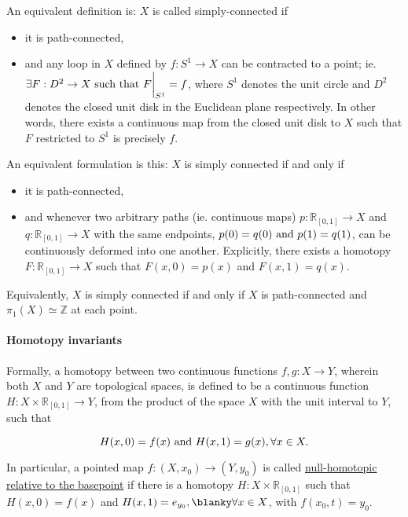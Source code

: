 An equivalent definition is: $X$ is called simply-connected if

\begin{itemize}
    \item it is path-connected, 
    \item and any loop in $X$ defined by $f: S^{1} \to X$ can be contracted to a point; ie. $\exists F: D^{2} \to X \textnormal{ such that } F\bigg|_{S^{1}} = f$, where ${S^{1}}$ denotes the unit circle and $D^2$ denotes the closed unit disk in the Euclidean plane respectively. In other words, there exists a continuous map from the closed unit disk to $X$ such that $F$ restricted to $S^1$ is precisely $f$.
\end{itemize}

An equivalent formulation is this: $X$ is simply connected if and only if 

\begin{itemize}
    \item it is path-connected,
    \item and whenever two arbitrary paths (ie. continuous maps) $p: \mathds{R}_{[0,1]} \to X$ and $q: \mathds{R}_{[0,1]} \to X$ with the same endpoints, $p(0) = q(0) \textnormal{ and } p(1) = q(1)$, can be continuously deformed into one another. Explicitly, there exists a homotopy $F: \mathds{R}_{[0,1]} \to X$ such that $F(x,0) = p(x)$ and $F(x,1) = q(x)$. \\
\end{itemize}

Equivalently, $X$ is simply connected if and only if $X$ is path-connected and $\pi_1 (X) \simeq \mathds{Z}$ at each point. \\

\paragraph{\textbf{Homotopy invariants}}

Formally, a homotopy between two continuous functions $f, g: X \to Y$, wherein both $X$ and $Y$ are topological spaces, is defined to be a continuous function $H: X \times \mathds{R}_{[0,1]} \to Y$, from the product of the space $X$ with the unit interval to $Y$, such that 

$$
    H(x,0) = f(x) \textnormal{ and } H(x, 1) = g(x), \forall x \in X.
$$

In particular, a pointed map $f: (X, x_0) \rightarrow (Y, y_0)$ is called \underline{null-homotopic relative to the basepoint} if there is a homotopy $H: X\times \mathds{R}_{[0,1]}$ such that $H(x,0) = f(x)$ and $H(x, 1) = e_{y_0}, \blanky \forall x \in X$, with $f(x_0, t) = y_0$. \clearpage

